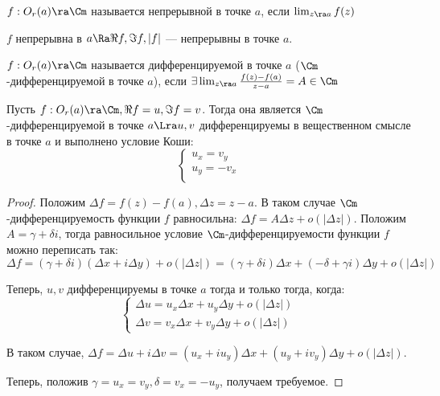 \begin{definition}
    \(f: O_r(a) \ra \Cm\) называется непрерывной в точке \(a\), если \(\lim_{z \ra a} f(z)\)
\end{definition}

\begin{note}
    \(f\) непрерывна в \(a \Ra \Re f, \Im f, |f|\) --- непрерывны в точке \(a\).
\end{note}

\begin{definition}
    \(f: O_r(a) \ra \Cm\) называется дифференцируемой в точке \(a\) (\(\Cm\)-дифференцируемой в точке \(a\)), если \(\exists \lim_{z \ra a} \frac{f(z) - f(a)}{z - a} = A \in \Cm\)
\end{definition}

\begin{theorem}
    Пусть \(f: O_r(a) \ra \Cm, \Re f = u, \Im f = v\). Тогда она является \(\Cm\)-дифференцируемой в точке \(a \Lra u, v\) дифференцируемы в вещественном смысле в точке \(a\) и выполнено условие Коши:
    \begin{equation*}
        \begin{cases*}
            u_x = v_y \\
            u_y = -v_x \\
        \end{cases*}
    \end{equation*}
\end{theorem}
\begin{proof}
    Положим \(\Delta f = f(z) - f(a), \Delta z = z - a\). В таком случае \(\Cm\)-дифференцируемость функции \(f\) равносильна: \(\Delta f = A \Delta z + o(|\Delta z|)\). Положим \(A = \gamma + \delta i\), тогда равносильное условие \(\Cm\)-дифференцируемости функции \(f\) можно переписать так:
    \[\Delta f = (\gamma + \delta i)(\Delta x + i \Delta y) + o(|\Delta z|) = (\gamma + \delta i)\Delta x + (-\delta +\gamma i)\Delta y + o(|\Delta z|)\]
    
    Теперь, \(u, v\) дифференцируемы в точке \(a\) тогда и только тогда, когда:
    \[\left\{\begin{array}{l}
        \Delta u = u_x \Delta x + u_y \Delta y + o(|\Delta z|) \\
        \Delta v = v_x \Delta x + v_y \Delta y + o(|\Delta z|)
    \end{array}\right.\]
    
    В таком случае, \(\Delta f = \Delta u + i\Delta v = (u_x + iu_y)\Delta x + (u_y + iv_y)\Delta y + o(|\Delta z|)\).

    Теперь, положив \(\gamma = u_x = v_y, \delta = v_x = -u_y\), получаем требуемое.
\end{proof}

